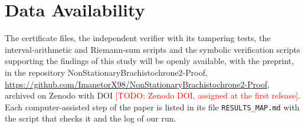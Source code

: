 \documentclass[aip,jmp,amsmath,amssymb,reprint]{revtex4-2}
\newcommand{\todo}[1]{\textcolor{red}{[TODO: #1]}}
\theoremstyle{plain}
\theoremstyle{definition}
\begin{document}
\section*{Data Availability}
The certificate files, the independent verifier with its tampering tests, the interval-arithmetic and Riemann-sum
scripts and the symbolic verification scripts supporting the findings of this study will be openly available,
with the preprint, in the repository NonStationaryBrachistochrone2-Proof,
\url{https://github.com/ImanetorX98/NonStationaryBrachistochrone2-Proof}, archived on Zenodo with DOI
\todo{Zenodo DOI, assigned at the first release}. Each computer-assisted step of the paper is listed in its file
\texttt{RESULTS\_MAP.md} with the script that checks it and the log of our run.


\end{document}

